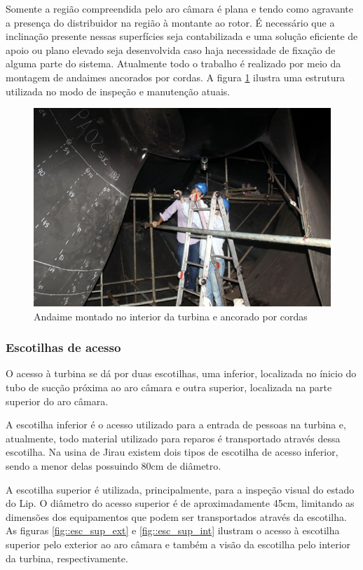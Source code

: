 Somente a região compreendida pelo aro câmara é plana e tendo como agravante a presença do distribuidor na região à 
montante ao rotor. É necessário que a inclinação presente nessas superfícies seja contabilizada e uma solução eficiente 
de apoio ou plano elevado seja desenvolvida caso haja necessidade de fixação de alguma parte do sistema. Atualmente todo 
o trabalho é realizado por meio da montagem de andaimes ancorados por cordas. A
figura \ref{fig::andaime} ilustra uma estrutura utilizada no modo de inspeção e
manutenção atuais.

\begin{figure}[h!]	
	\includegraphics[width=\columnwidth]{figs/viagem/2015_04_28/UG/img_4969}
	\caption{Andaime montado no interior da turbina e ancorado por cordas}
	\label{fig::andaime}
\end{figure}

 
\subsubsection{Escotilhas de acesso}
O acesso à turbina se dá por duas escotilhas, uma inferior, localizada no ínicio do tubo de sucção 
próxima ao aro câmara e outra superior, localizada na parte superior do aro câmara.

A escotilha inferior é o acesso utilizado para a entrada de pessoas na turbina e, atualmente, todo 
material utilizado para reparos é transportado através dessa escotilha. Na usina de Jirau existem dois 
tipos de escotilha de acesso inferior, sendo a menor delas possuindo 80cm de diâmetro. 

A escotilha superior é utilizada, principalmente, para a inspeção visual do estado do Lip. 
O diâmetro do acesso superior é de aproximadamente 45cm, limitando as dimensões dos equipamentos que podem 
ser transportados através da escotilha. As figuras \ref{fig::esc_sup_ext} e
\ref{fig::esc_sup_int} ilustram o acesso à escotilha superior pelo exterior ao
aro câmara e também a visão da escotilha pelo interior da turbina,
respectivamente.

